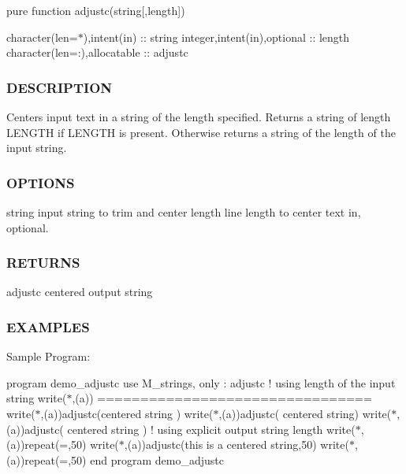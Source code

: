 pure function adjustc(string\mbox{[},length\mbox{]})

character(len=$\ast$),intent(in) \+:\+: string integer,intent(in),optional \+:\+: length character(len=\+:),allocatable \+:\+: adjustc

\subsubsection*{D\+E\+S\+C\+R\+I\+P\+T\+I\+ON}

Centers input text in a string of the length specified. Returns a string of length L\+E\+N\+G\+TH if L\+E\+N\+G\+TH is present. Otherwise returns a string of the length of the input string. \subsubsection*{O\+P\+T\+I\+O\+NS}

string input string to trim and center length line length to center text in, optional. \subsubsection*{R\+E\+T\+U\+R\+NS}

adjustc centered output string

\subsubsection*{E\+X\+A\+M\+P\+L\+ES}

Sample Program\+:

program demo\+\_\+adjustc use M\+\_\+strings, only \+: adjustc ! using length of the input string write($\ast$,\textquotesingle{}(a)\textquotesingle{}) \textquotesingle{}================================\textquotesingle{} write($\ast$,\textquotesingle{}(a)\textquotesingle{})adjustc(\textquotesingle{}centered string \textquotesingle{}) write($\ast$,\textquotesingle{}(a)\textquotesingle{})adjustc(\textquotesingle{} centered string\textquotesingle{}) write($\ast$,\textquotesingle{}(a)\textquotesingle{})adjustc(\textquotesingle{} centered string \textquotesingle{}) ! using explicit output string length write($\ast$,\textquotesingle{}(a)\textquotesingle{})repeat(\textquotesingle{}=\textquotesingle{},50) write($\ast$,\textquotesingle{}(a)\textquotesingle{})adjustc(\textquotesingle{}this is a centered string\textquotesingle{},50) write($\ast$,\textquotesingle{}(a)\textquotesingle{})repeat(\textquotesingle{}=\textquotesingle{},50) end program demo\+\_\+adjustc


